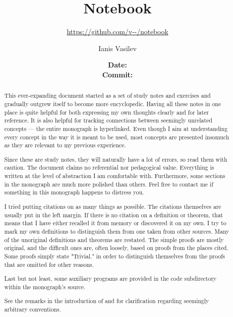 \documentclass{classes/notebook}
\title{Notebook}
\subtitle{\url{https://github.com/v--/notebook}}
\author{Ianis Vasilev}
\date
  {
    \normalsize
    \textbf{Date:} \GitCommitInfoDate \\
    \textbf{Commit:} \texttt{\GitCommitInfoHash}
  }
\begin{document}
  \maketitle

  \begin{abstract}
    This ever-expanding document started as a set of study notes and exercises and gradually outgrew itself to become more encyclopedic. Having all these notes in one place is quite helpful for both expressing my own thoughts clearly and for later reference. It is also helpful for tracking connections between seemingly unrelated concepts --- the entire monograph is hyperlinked. Even though I aim at understanding every concept in the way it is meant to be used, most concepts are presented insomuch as they are relevant to my previous experience.

    Since these are study notes, they will naturally have a lot of errors, so read them with caution. The document claims no referential nor pedagogical value. Everything is written at the level of abstraction I am comfortable with. Furthermore, some sections in the monograph are much more polished than others. Feel free to contact me if something in this monograph happens to distress you.

    I tried putting citations on as many things as possible. The citations themselves are usually put in the left margin. If there is no citation on a definition or theorem, that means that I have either recalled it from memory or discovered it on my own. I try to mark my own definitions to distinguish them from one taken from other sources. Many of the unoriginal definitions and theorems are restated. The simple proofs are mostly original, and the difficult ones are, often loosely, based on proofs from the places cited. Some proofs simply state "Trivial." in order to distinguish themselves from the proofs that are omitted for other reasons.

    Last but not least, some auxiliary programs are provided in the code subdirectory within the monograph's source.

    See the remarks in the introduction of  and  for clarification regarding seemingly arbitrary conventions.
  \end{abstract}

  \newpage
  \tableofcontents
  \newpage

  
  
  
  
  
  
\end{document}
